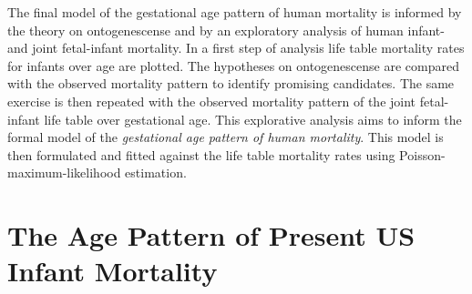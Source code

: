 \documentclass[12pt, parskip=half]{scrartcl}
\begin{document}
The final model of the gestational age pattern of human mortality is informed by the theory on ontogenescense and by an exploratory analysis of human infant- and joint fetal-infant mortality. In a first step of analysis life table mortality rates for infants over age are plotted. The hypotheses on ontogenescense are compared with the observed mortality pattern to identify promising candidates. The same exercise is then repeated with the observed mortality pattern of the joint fetal-infant life table over gestational age. This explorative analysis aims to inform the formal model of the \emph{gestational age pattern of human mortality}. This model is then formulated and fitted against the life table mortality rates using Poisson-maximum-likelihood estimation.

\section{The Age Pattern of Present US Infant Mortality} %
\label{sec:the_daily_age_pattern_of_present_day_us_infant_mortality}
\end{document}

